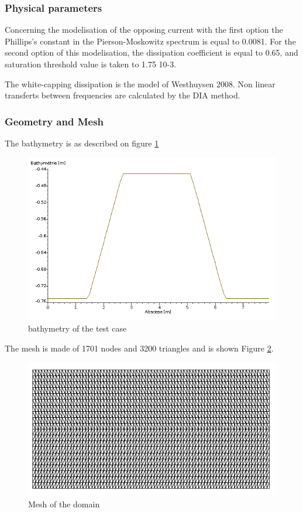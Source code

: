 \subsubsection{Physical parameters}
 Concerning the modelisation of the opposing current with the first option the Phillips’s constant in the Pierson-Moskowitz spectrum is equal to 0.0081. 
For the second option of this modelisation, the dissipation coefficient is equal to 0.65, and saturation threshold value is taken to 1.75 10-3.

The white-capping dissipation is the model of Westhuysen 2008. Non linear transferts between frequencies are calculated by the DIA method.  

%
%
%
\subsubsection{Geometry and Mesh}
%
The bathymetry is as described on figure \ref{bathyop}
\begin{figure} [!h]
\centering
\includegraphics[scale = 0.65]{bathymetrie.png}
 \caption{bathymetry of the test case }
\label{bathyop}
\end{figure}

The mesh is made of 1701 nodes and 3200 triangles  and is shown Figure \ref{mailop}. 
\begin{figure} [!h]
\centering
\includegraphics[scale = 0.65]{maillage.png}
 \caption{Mesh of the domain}
\label{mailop}
\end{figure}



